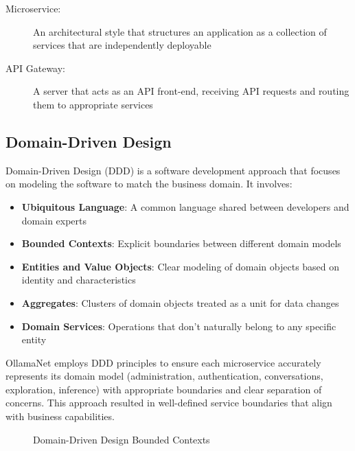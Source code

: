 \begin{terminology}
\begin{description}
    \item[Microservice:] An architectural style that structures an application as a collection of services that are independently deployable
    \item[API Gateway:] A server that acts as an API front-end, receiving API requests and routing them to appropriate services
\end{description}
\end{terminology}

\subsection{Domain-Driven Design}

Domain-Driven Design (DDD) is a software development approach that focuses on modeling the software to match the business domain. It involves:

\begin{itemize}
    \item \textbf{Ubiquitous Language}: A common language shared between developers and domain experts
    \item \textbf{Bounded Contexts}: Explicit boundaries between different domain models
    \item \textbf{Entities and Value Objects}: Clear modeling of domain objects based on identity and characteristics
    \item \textbf{Aggregates}: Clusters of domain objects treated as a unit for data changes
    \item \textbf{Domain Services}: Operations that don't naturally belong to any specific entity
\end{itemize}

OllamaNet employs DDD principles to ensure each microservice accurately represents its domain model (administration, authentication, conversations, exploration, inference) with appropriate boundaries and clear separation of concerns. This approach resulted in well-defined service boundaries that align with business capabilities.

\begin{figure}
    \centering
    \caption{Domain-Driven Design Bounded Contexts}
    \label{fig:ddd-contexts}
\end{figure}


